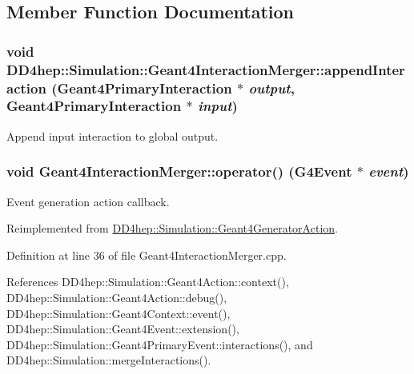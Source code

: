 \subsection{Member Function Documentation}
\hypertarget{class_d_d4hep_1_1_simulation_1_1_geant4_interaction_merger_a224d85d05dcd541ef4185e0a91ade714}{
\subsubsection[{appendInteraction}]{\setlength{\rightskip}{0pt plus 5cm}void DD4hep::Simulation::Geant4InteractionMerger::appendInteraction ({\bf Geant4PrimaryInteraction} $\ast$ {\em output}, \/  {\bf Geant4PrimaryInteraction} $\ast$ {\em input})}}
\label{class_d_d4hep_1_1_simulation_1_1_geant4_interaction_merger_a224d85d05dcd541ef4185e0a91ade714}


Append input interaction to global output. \hypertarget{class_d_d4hep_1_1_simulation_1_1_geant4_interaction_merger_a5af2cee708859468f78130560ffa4a6e}{
\subsubsection[{operator()}]{\setlength{\rightskip}{0pt plus 5cm}void Geant4InteractionMerger::operator() (G4Event $\ast$ {\em event})}}
\label{class_d_d4hep_1_1_simulation_1_1_geant4_interaction_merger_a5af2cee708859468f78130560ffa4a6e}


Event generation action callback. 

Reimplemented from \hyperlink{class_d_d4hep_1_1_simulation_1_1_geant4_generator_action_ac5a1d2335a19e3f9d555081199e01801}{DD4hep::Simulation::Geant4GeneratorAction}.

Definition at line 36 of file Geant4InteractionMerger.cpp.

References DD4hep::Simulation::Geant4Action::context(), DD4hep::Simulation::Geant4Action::debug(), DD4hep::Simulation::Geant4Context::event(), DD4hep::Simulation::Geant4Event::extension(), DD4hep::Simulation::Geant4PrimaryEvent::interactions(), and DD4hep::Simulation::mergeInteractions().

